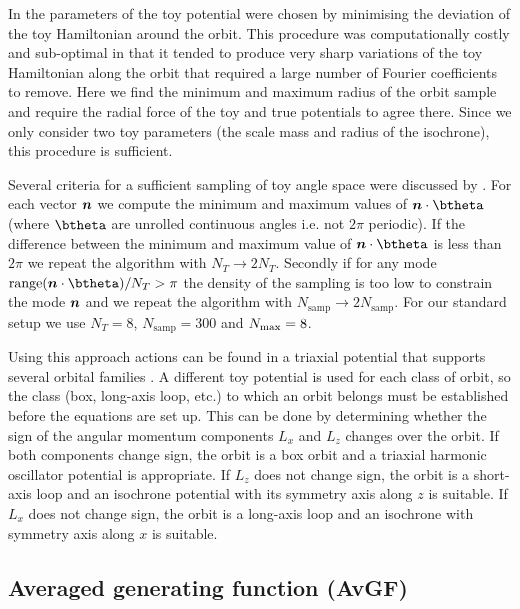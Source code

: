 \documentclass[useAMS,usenatbib,fleqn,a4paper]{mn2e}
\newcommand{\bs}[1]{\bmath{#1}}
\begin{document}
In \cite{SandersBinney2014} the parameters of the toy potential were chosen
by minimising the deviation of the toy Hamiltonian around the orbit. This
procedure was computationally costly and sub-optimal in that it tended to
produce very sharp variations of the toy Hamiltonian along the orbit that
required a large number of Fourier coefficients to remove. Here we find the
minimum and maximum radius of the orbit sample and require the radial force
of the toy and true potentials to agree there. Since we only consider two toy
parameters (the scale mass and radius of the isochrone), this procedure is
sufficient.

Several criteria for a sufficient sampling of toy angle space were discussed
by \cite{SandersBinney2014}. For each vector $\bs{n}$ we compute the minimum
and maximum values of $\bs{n}\cdot\btheta$ (where $\btheta$ are unrolled continuous
angles i.e. not $2\pi$ periodic). If the difference between the minimum and
maximum value of $\bs{n}\cdot\btheta$ is less than $2\pi$ we repeat the algorithm
with $N_T\rightarrow 2N_T$. Secondly if for any mode
$\hbox{range}(\bs{n}\cdot\btheta)/N_T>\pi$ the density of the sampling is too low to
constrain the mode $\bs{n}$ and we repeat the algorithm with
$N_\mathrm{samp}\rightarrow 2N_\mathrm{samp}$. For our standard setup we use
$N_T=8$, $N_\mathrm{samp}=300$ and $N_{\rm max}=8$.

Using this approach actions can be found in a triaxial potential that
supports several orbital families \citep{SandersBinney2014}. A different toy
potential is used for each class of orbit, so the class (box, long-axis loop,
etc.) to which an orbit belongs must be established before the equations are
set up.  This can be done by determining whether the sign of the angular
momentum components $L_x$ and $L_z$ changes over the orbit. If both
components change sign, the orbit is a box orbit and a triaxial harmonic
oscillator potential is appropriate. If $L_z$ does not change sign, the orbit
is a short-axis loop and an isochrone potential with its symmetry axis along
$z$ is suitable. If $L_x$ does not change sign, the orbit is a long-axis loop
and an isochrone with symmetry axis along $x$ is suitable.


\subsection{Averaged generating function (AvGF)}\label{Method::AvGenfunc}
\end{document}
